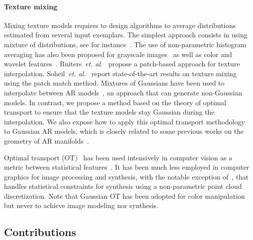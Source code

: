 \paragraph{Texture mixing}

Mixing texture models requires to design algorithms to average distributions estimated from several input exemplars. The simplest approach consists in using mixture of distributions, see for instance~\cite{bar-joseph-texture-mixing}. The use of non-parametric histogram averaging has also been proposed for grayscale images~\cite{matusik-mixing} as well as color and wavelet features~\cite{rabin-textures}. Ruiters~\emph{et. al.}~\cite{ruiters-2010-interpolation} propose a patch-based approach for texture interpolation. Soheil~\emph{et. al.}~\cite{ImageMelding12} report state-of-the-art results on texture mixing using the patch match method. Mixtures of Gaussians have been used to interpolate between AR models~\cite{ar-mixing}, an approach that can generate non-Gaussian models. In contrast, we propose a method based on the theory of optimal transport to ensure that the texture models stay Gaussian during the interpolation. We also expose how to apply this optimal transport methodology to Gaussian AR models, which is closely related to some previous works on the geometry of AR manifolds~\cite{ravishanker-arfima,ravishanker-arma,garderen-ar}.

Optimal transport (OT)~\cite{villani-topics} has been used intensively in computer vision as a metric between statistical features~\cite{rubner-emd}. It has been much less employed in computer graphics for image processing and synthesis, with the notable exception of~\cite{rabin-textures}, that handles statistical constraints for synthesis using a non-parametric point cloud discretization. Note that Gaussian OT has been adopted for color manipulation~\cite{fpitie07a} but never to achieve image modeling nor synthesis.


\subsection{Contributions}
\label{sec-contrib}

